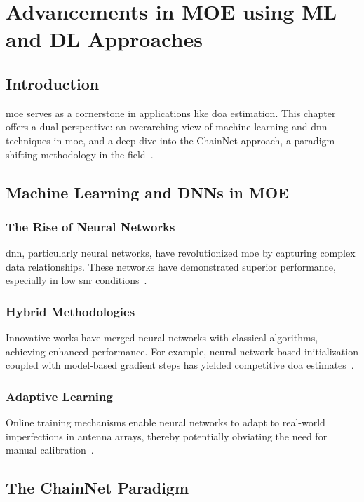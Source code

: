\chapter{Advancements in MOE using ML and DL Approaches}
\label{chap:prev_works_moe_ml_dl}

\section{Introduction}
\gls{moe} serves as a cornerstone in applications like \gls{doa} estimation. This chapter offers a dual perspective:
an overarching view of machine learning and \gls{dnn} techniques in \gls{moe}, and a deep dive into the ChainNet
approach, a paradigm-shifting methodology in the field~\cite{barthelme2022chainnet}.

\section{Machine Learning and DNNs in MOE}

\subsection{The Rise of Neural Networks}
\gls{dnn}, particularly neural networks, have revolutionized \gls{moe} by capturing complex data relationships.
These networks have demonstrated superior performance, especially in low \gls{snr} conditions~\cite{barthelme2020}.

\subsection{Hybrid Methodologies}
Innovative works have merged neural networks with classical algorithms, achieving enhanced performance. For example,
neural network-based initialization coupled with model-based gradient steps has yielded competitive \gls{doa}
estimates~\cite{bialer2019performanceCHECK}.

\subsection{Adaptive Learning}
Online training mechanisms enable neural networks to adapt to real-world imperfections in antenna arrays, thereby
potentially obviating the need for manual calibration~\cite{barthelme2020}.

\section{The ChainNet Paradigm}


